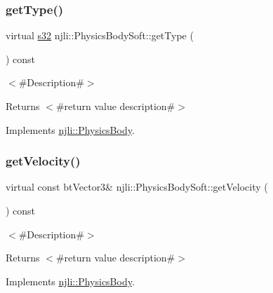 \subsubsection{\texorpdfstring{get\+Type()}{getType()}}
{\footnotesize\ttfamily virtual \mbox{\hyperlink{_util_8h_aa62c75d314a0d1f37f79c4b73b2292e2}{s32}} njli\+::\+Physics\+Body\+Soft\+::get\+Type (\begin{DoxyParamCaption}{ }\end{DoxyParamCaption}) const\hspace{0.3cm}{\ttfamily [virtual]}}

$<$\#\+Description\#$>$

\begin{DoxyReturn}{Returns}
$<$\#return value description\#$>$ 
\end{DoxyReturn}


Implements \mbox{\hyperlink{classnjli_1_1_physics_body_a1338648bed55e4ca2d3c50d953fd60c4}{njli\+::\+Physics\+Body}}.

\mbox{\label{classnjli_1_1_physics_body_soft_af8cbddbeb15e03ebdf1e6000d7abb6a4}} 
\subsubsection{\texorpdfstring{get\+Velocity()}{getVelocity()}}
{\footnotesize\ttfamily virtual const bt\+Vector3\& njli\+::\+Physics\+Body\+Soft\+::get\+Velocity (\begin{DoxyParamCaption}{ }\end{DoxyParamCaption}) const\hspace{0.3cm}{\ttfamily [virtual]}}

$<$\#\+Description\#$>$

\begin{DoxyReturn}{Returns}
$<$\#return value description\#$>$ 
\end{DoxyReturn}


Implements \mbox{\hyperlink{classnjli_1_1_physics_body_add437a6d229dfbf74a838d0de7229867}{njli\+::\+Physics\+Body}}.

\mbox{\label{classnjli_1_1_physics_body_soft_a22d6c5a0a3572feb0a8888e54b2c0e9a}} 
